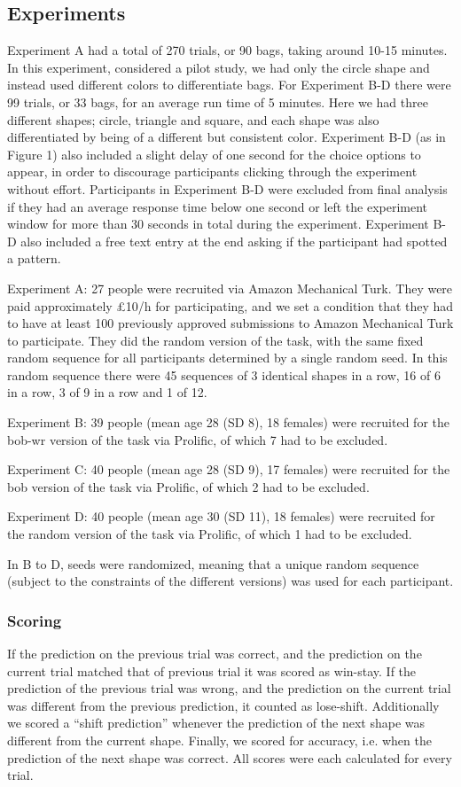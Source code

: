 \documentclass[10pt,letterpaper]{article}
\begin{document}
\subsection{Experiments}

Experiment A had a total of 270 trials, or 90 bags, taking around 10-15 minutes. In this experiment, considered a pilot study, we had only the circle shape and instead used different colors to differentiate bags. For Experiment B-D there were 99 trials, or 33 bags, for an average run time of 5 minutes. Here we had three different shapes; circle, triangle and square, and each shape was also differentiated by being of a different but consistent color. Experiment B-D (as in Figure 1) also included a slight delay of one second for the choice options to appear, in order to discourage participants clicking through the experiment without effort. Participants in Experiment B-D were excluded from final analysis if they had an average response time below one second or left the experiment window for more than 30 seconds in total during the experiment. Experiment B-D also included a free text entry at the end asking if the participant had spotted a pattern.

Experiment A: 27 people were recruited via Amazon Mechanical Turk. They were paid approximately £10/h for participating, and we set a condition that they had to have at least 100 previously approved submissions to Amazon Mechanical Turk to participate. They did the random version of the task, with the same fixed random sequence for all participants determined by a single random seed. In this random sequence there were 45 sequences of 3 identical shapes in a row, 16 of 6 in a row, 3 of 9 in a row and 1 of 12.

Experiment B: 39 people (mean age 28 (SD 8), 18 females) were recruited for the bob-wr version of the task via Prolific, of which 7 had to be excluded.

Experiment C: 40 people (mean age 28 (SD 9), 17 females) were recruited for the bob version of the task via Prolific, of which 2 had to be excluded.

Experiment D: 40 people (mean age 30 (SD 11), 18 females) were recruited for the random version of the task via Prolific, of which 1 had to be excluded. 

In B to D, seeds were randomized, meaning that a unique random sequence (subject to the constraints of the different versions) was used for each participant.

\subsubsection{Scoring} If the prediction on the previous trial was correct, and the prediction on the current trial matched that of previous trial it was scored as win-stay. If the prediction of the previous trial was wrong, and the prediction on the current trial was different from the previous prediction, it counted as lose-shift. Additionally we scored a “shift prediction” whenever the prediction of the next shape was different from the current shape. Finally, we scored for accuracy, i.e. when the prediction of the next shape was correct. All scores were each calculated for every trial.
\end{document}
